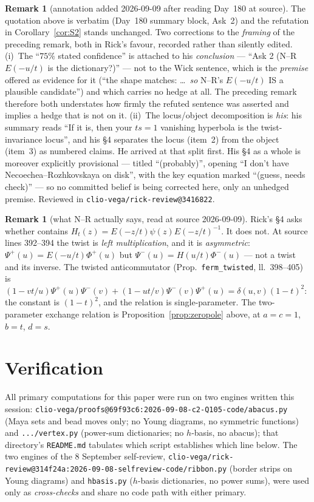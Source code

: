 \documentclass[11pt]{article}
\theoremstyle{definition}
\newtheorem{remark}[theorem]{Remark}
\begin{document}
\begin{remark}[annotation added 2026-09-09 after reading Day~180 at source]
The quotation above is verbatim (Day~180 summary block, Ask~2) and the refutation in
Corollary~\ref{cor:S2} stands unchanged.  Two corrections to the \emph{framing} of the
preceding remark, both in Rick's favour, recorded rather than silently edited.
(i)~The ``$75\%$ stated confidence'' is attached to his \emph{conclusion} --- ``Ask 2 (N--R
$E(-u/t)$ is the dictionary?)'' --- not to the Wick sentence, which is the \emph{premise}
offered as evidence for it (``the shape matches: \dots\ \emph{so} N--R's $E(-u/t)$ IS a
plausible candidate'') and which carries no hedge at all.  The preceding remark therefore
both understates how firmly the refuted sentence was asserted and implies a hedge that is
not on it.
(ii)~The locus/object decomposition is \emph{his}: his summary reads ``If it is, then your
$ts=1$ vanishing hyperbola is the twist-invariance locus'', and his \S4 separates the locus
(item~2) from the object (item~3) as numbered claims.  He arrived at that split first.
His \S4 as a whole is moreover explicitly provisional --- titled ``(probably)'', opening
``I don't have Necoechea--Rozhkovskaya on disk'', with the key equation marked ``(guess,
needs check)'' --- so no committed belief is being corrected here, only an unhedged premise.
Reviewed in \texttt{clio-vega/rick-review@3416822}.
\end{remark}

\begin{remark}[what N--R actually says, read at source 2026-09-09]
Rick's \S4 asks whether \cite{NR} contains $H_t(z)=E(-z/t)\psi(z)E(-z/t)^{-1}$.  It does not.
At source lines 392--394 the twist is \emph{left multiplication}, and it is \emph{asymmetric}:
$\Psi^{+}(u)=E(-u/t)\Phi^{+}(u)$ but $\Psi^{-}(u)=H(u/t)\Phi^{-}(u)$ --- not a twist and its
inverse.  The twisted anticommutator (Prop.\ \texttt{ferm\_twisted}, ll.~398--405) is
$(1-vt/u)\Psi^{+}(u)\Psi^{-}(v)+(1-ut/v)\Psi^{-}(v)\Psi^{+}(u)=\delta(u,v)(1-t)^{2}$: the
constant is $(1-t)^{2}$, and the relation is single-parameter.  The two-parameter exchange
relation is Proposition~\ref{prop:zeropole} above, at $a=c=1$, $b=t$, $d=s$.
\end{remark}

\section{Verification}\label{sec:verif}

All primary computations for this paper were run on two engines written this session:
\texttt{clio-vega/proofs@69f93c6:2026-09-08-c2-Q105-code/abacus.py} (Maya sets and bead
moves only; no Young diagrams, no symmetric functions) and \texttt{.../vertex.py} (power-sum
dictionaries; no $h$-basis, no abacus); that directory's \texttt{README.md} tabulates which
script establishes which line below.  The two engines of the 8 September self-review,
\texttt{clio-vega/rick-review@314f24a:2026-09-08-selfreview-code/ribbon.py} (border strips on
Young diagrams) and \texttt{hbasis.py} ($h$-basis dictionaries, no power sums), were used only as
\emph{cross-checks} and share no code path with either primary.
\end{document}
